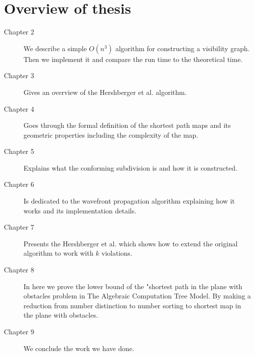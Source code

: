 \section{Overview of thesis}
\begin{description}

	\item[Chapter 2] We describe a simple $O(n^3)$ algorithm for constructing a
		visibility graph. Then we implement it and compare the run time to the
		theoretical time.

	\item [Chapter 3] Gives an overview of the Hershberger et al.
		\cite{HershbergerS99} algorithm.

	\item [Chapter 4] Goes through the formal definition of the shortest path
		maps and its geometric properties including the complexity of the map.

	\item [Chapter 5] Explains what the conforming subdivision is and how it is
		constructed.

	\item [Chapter 6] Is dedicated to the wavefront propagation algorithm
		explaining how it works and its implementation details.

	\item [Chapter 7] Presents the Hershberger et al. \cite{HershbergerKS17}
		which shows how to extend the original algorithm to work with $k$
		violations.

	\item [Chapter 8] In here we prove the lower bound of the "shortest path in
		the plane with obstacles problem in The Algebraic Computation Tree Model.
		By making a reduction from number distinction to number sorting to
		shortest map in the plane with obstacles.

	\item [Chapter 9] We conclude the work we have done.

\end{description}
